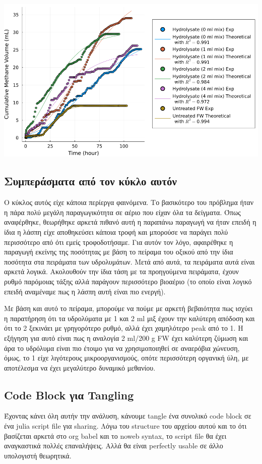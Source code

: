 \documentclass[11pt]{article}
\begin{document}
\begin{center}
\includegraphics[width=.9\linewidth]{../plots/BMPs/methane_s2_r1_comp.png}
\end{center}

\subsection{Συμπεράσματα από τον κύκλο αυτόν}
\label{sec:orge6ab5c3}
Ο κύκλος αυτός είχε κάποια περίεργα φαινόμενα. Το βασικότερο του πρόβλημα ήταν η πάρα πολύ μεγάλη παραγωγικότητα σε αέριο που είχαν όλα τα δείγματα. Όπως αναφέρθηκε, θεωρήθηκε αρκετά πιθανό αυτή η παραπάνω παραγωγή να ήταν επειδή η ίδια η λάσπη είχε αποθηκεύσει κάποια τροφή και μπορούσε να παράγει πολύ περισσότερο από ότι εμείς τροφοδοτήσαμε. Για αυτόν τον λόγο, αφαιρέθηκε η παραγωγή εκείνης της ποσότητας με βάση το πείραμα του οξικού από την ίδια ποσότητα στα πειράματα των υδρολυμάτων. Μετά από αυτά, τα πειράματα αυτά είναι αρκετά λογικά. Ακολουθούν την ίδια τάση με τα προηγούμενα πειράματα, έχουν ρυθμό παρόμοιας τάξης αλλά παράγουν περισσότερο βιοαέριο (το οποίο είναι λογικό επειδή αναμέναμε πως η λάσπη αυτή είναι πιο ενεργή).

Με βάση και αυτό το πείραμα, μπορούμε να πούμε με αρκετή βεβαιότητα πως ισχύει η παρατήρηση ότι τα υδρολύματα με 1 και 2 ml μιξ έχουν την καλύτερη απόδοση και ότι το 2 ξεκινάει με γρηγορότερο ρυθμό, αλλά έχει χαμηλότερο peak από το 1. Η εξήγηση για αυτό είναι πως η αναλογία 2 ml/200 g FW έχει καλύτερη ζύμωση και άρα το υδρόλυμα είναι πιο έτοιμο για να χρησιμοποιηθεί σε αναερόβια χώνευση, όμως, το 1 είχε λιγότερους μικροοργανισμούς, οπότε περισσότερη οργανική ύλη, με αποτέλεσμα να έχει μεγαλύτερο δυναμικό μεθανίου.

\subsection{Code Block για Tangling}
\label{sec:org4da40d3}
Έχοντας κάνει όλη αυτήν την ανάλυση, κάνουμε tangle ένα συνολικό code block σε ένα julia script file για sharing. Λόγω του structure του αρχείου αυτού και το ότι βασίζεται αρκετά στο org babel και το noweb syntax, το script file θα έχει αναγκαστικά πολλές επαναλήψεις. Αλλά θα είναι perfectly usable σε άλλο υπολογιστή θεωρητικά.
\end{document}

